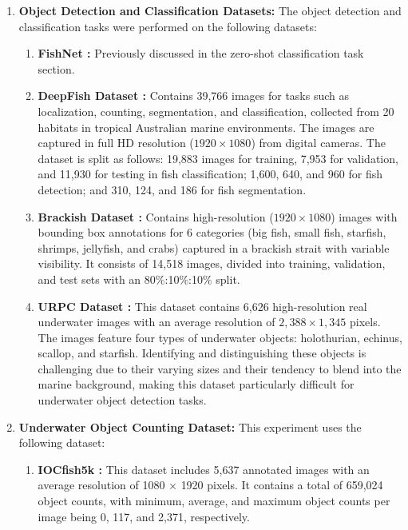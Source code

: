 \begin{enumerate}
\item \textbf{Object Detection and Classification Datasets:} The object detection and classification tasks were performed on the following datasets:
\begin{enumerate}
    \item  \textbf{FishNet \cite{khan2023fishnet}:} Previously discussed in the zero-shot classification task section.
    \item \textbf{DeepFish Dataset \cite{saleh2020realistic}:} Contains 39,766 images for tasks such as localization, counting, segmentation, and classification, collected from 20 habitats in tropical Australian marine environments. 
The images are captured in full HD resolution ($1920 \times 1080$) from digital cameras. 
The dataset is split as follows: 19,883 images for training, 7,953 for validation, and 11,930 for testing in fish classification; 1,600, 640, and 960 for fish detection; and 310, 124, and 186 for fish segmentation.
\item \textbf{Brackish Dataset \cite{Pedersen_2019_CVPR_Workshops}:} Contains high-resolution ($1920 \times 1080$) images with bounding box annotations for 6 categories (big fish, small fish, starfish, shrimps, jellyfish, and crabs) captured in a brackish strait with variable visibility.
It consists of 14,518 images, divided into training, validation, and test sets with an 80$\%$:10$\%$:10$\%$ split.
\item \textbf{URPC Dataset \cite{urpc}:} This dataset contains 6,626 high-resolution real underwater images with an average resolution of $2,388 \times 1,345$ pixels. 
The images feature four types of underwater objects: holothurian, echinus, scallop, and starfish. 
Identifying and distinguishing these objects is challenging due to their varying sizes and their tendency to blend into the marine background, making this dataset particularly difficult for underwater object detection tasks.
    
\end{enumerate}

\item \textbf{Underwater Object Counting Dataset:}  This experiment uses the following dataset:

\begin{enumerate}
    \item \textbf{IOCfish5k \cite{sun2023indiscernible}:} This dataset includes 5,637 annotated images with an average resolution of 1080 × 1920 pixels. It contains a total of 659,024 object counts, with minimum, average, and maximum object counts per image being 0, 117, and 2,371, respectively.
\end{enumerate}
    
\end{enumerate}

